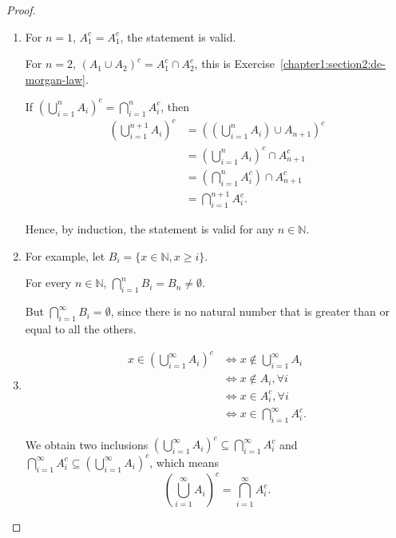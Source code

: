 \documentclass[class=understanding-analysis,crop=false]{standalone}
\begin{document}
\begin{proof}
    \begin{enumerate}[label = (\alph*)]
        \item For $n = 1$, $A_{1}^{c} = A_{1}^{c}$, the statement is valid.
              \par For $n = 2$, $\left(A_{1}\cup A_{2}\right)^{c} = A_{1}^{c}\cap A_{2}^{c}$, this is Exercise~\ref{chapter1:section2:de-morgan-law}.
              \par If $\left(\bigcup^{n}_{i=1}A_{i}\right)^{c} = \bigcap^{n}_{i=1}A_{i}^{c}$, then
              \begin{align*}
                  \left(\bigcup^{n+1}_{i=1}A_{i}\right)^{c} & = \left(\left(\bigcup^{n}_{i=1}A_{i}\right)\cup A_{n+1}\right)^{c} \\
                                                            & = \left(\bigcup^{n}_{i=1}A_{i}\right)^{c} \cap A_{n+1}^{c}         \\
                                                            & = \left(\bigcap^{n}_{i=1}A_{i}^{c}\right) \cap A_{n+1}^{c}         \\
                                                            & = \bigcap^{n+1}_{i=1}A_{i}^{c}.
              \end{align*}
              \par Hence, by induction, the statement is valid for any $n \in \mathbb{N}$.
        \item For example, let $B_{i} = \{ x \in \mathbb{N}, x \ge i \}$.
              \par For every $n \in \mathbb{N}$, $\bigcap^{n}_{i=1}B_{i} = B_{n} \ne \emptyset$.
              \par But $\bigcap^{\infty}_{i=1}B_{i} = \emptyset$, since there is no natural number that is greater than or equal to all the others.
        \item
              \begin{align*}
                  x \in \left(\bigcup^{\infty}_{i=1}A_{i}\right)^{c} & \Longleftrightarrow x \notin \bigcup^{\infty}_{i=1}A_{i}   \\
                                                                     & \Longleftrightarrow x \notin A_{i}, \forall i              \\
                                                                     & \Longleftrightarrow x \in A_{i}^{c}, \forall i             \\
                                                                     & \Longleftrightarrow x \in \bigcap^{\infty}_{i=1}A_{i}^{c}.
              \end{align*}
              \par We obtain two inclusions $\left(\bigcup^{\infty}_{i=1}A_{i}\right)^{c} \subseteq \bigcap^{\infty}_{i=1}A_{i}^{c}$ and $\bigcap^{\infty}_{i=1}A_{i}^{c} \subseteq \left(\bigcup^{\infty}_{i=1}A_{i}\right)^{c}$, which means
              \[
                  \left(\bigcup^{\infty}_{i=1}A_{i}\right)^{c} = \bigcap^{\infty}_{i=1}A_{i}^{c}.
              \]
    \end{enumerate}
\end{proof}
\end{document}
